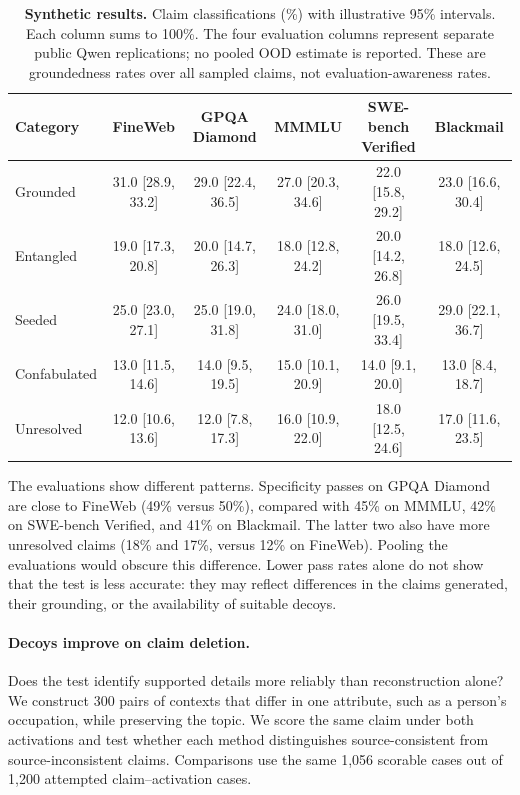 \begin{table}[t]
\centering\footnotesize
\setlength{\tabcolsep}{4pt}
\begin{tabular}{lccccc}
\hline
Category & FineWeb & GPQA Diamond & MMMLU & SWE-bench Verified & Blackmail \\
\hline
Grounded & 31.0 [28.9, 33.2] & 29.0 [22.4, 36.5] & 27.0 [20.3, 34.6] & 22.0 [15.8, 29.2] & 23.0 [16.6, 30.4] \\
Entangled & 19.0 [17.3, 20.8] & 20.0 [14.7, 26.3] & 18.0 [12.8, 24.2] & 20.0 [14.2, 26.8] & 18.0 [12.6, 24.5] \\
Seeded & 25.0 [23.0, 27.1] & 25.0 [19.0, 31.8] & 24.0 [18.0, 31.0] & 26.0 [19.5, 33.4] & 29.0 [22.1, 36.7] \\
Confabulated & 13.0 [11.5, 14.6] & 14.0 [9.5, 19.5] & 15.0 [10.1, 20.9] & 14.0 [9.1, 20.0] & 13.0 [8.4, 18.7] \\
Unresolved & 12.0 [10.6, 13.6] & 12.0 [7.8, 17.3] & 16.0 [10.9, 22.0] & 18.0 [12.5, 24.6] & 17.0 [11.6, 23.5] \\
\hline
\end{tabular}
\caption{\textbf{Synthetic results.} Claim classifications (\%) with illustrative
95\% intervals. Each column sums to 100\%. The four evaluation columns represent
separate public Qwen replications; no pooled OOD estimate is reported. These
are groundedness rates over all sampled claims, not evaluation-awareness rates.}
\label{tab:grounding-population}
\end{table}

The evaluations show different patterns. Specificity passes on GPQA Diamond
are close to FineWeb (49\% versus 50\%), compared with 45\% on MMMLU,
42\% on SWE-bench Verified, and 41\% on Blackmail. The latter two also have
more unresolved claims (18\% and 17\%, versus 12\% on FineWeb). Pooling the
evaluations would obscure this difference. Lower pass rates alone do not show
that the test is less accurate: they may reflect differences in the claims
generated, their grounding, or the availability of suitable decoys.

\paragraph{Decoys improve on claim deletion.}
Does the test identify supported details more reliably than reconstruction
alone? We construct 300 pairs of contexts that differ in one attribute, such
as a person's occupation, while preserving the topic. We score the same claim
under both activations and test whether each method distinguishes
source-consistent from source-inconsistent claims. Comparisons use the same 1,056 scorable cases out of 1,200
attempted claim--activation cases.

